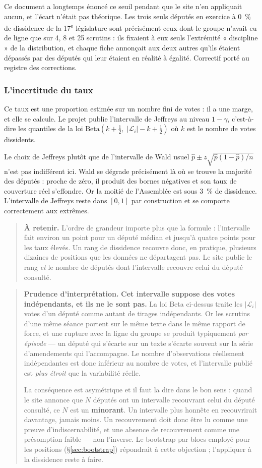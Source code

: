 \documentclass[11pt,a4paper]{article}
\newcommand{\important}[1]{\begin{quote}\small\color{blue!55!black}\textbf{À retenir.} #1\end{quote}}
\newcommand{\prudence}[1]{\begin{quote}\small\color{red!55!black}\textbf{Prudence d'interprétation.} #1\end{quote}}
\begin{document}
Ce document a longtemps énoncé ce seuil pendant que le site n'en appliquait
aucun, et l'écart n'était pas théorique. Les trois seuls députés en exercice à
0~\% de dissidence de la 17\textsuperscript{e} législature sont précisément ceux
dont le groupe n'avait eu de ligne que sur 4, 8 et 25 scrutins : ils fixaient à
eux seuls l'extrémité « discipline » de la distribution, et chaque fiche
annonçait aux deux autres qu'ils étaient dépassés par des députés qui leur
étaient en réalité à égalité. Correctif porté au registre des corrections.

\subsubsection*{L'incertitude du taux}

Ce taux est une proportion estimée sur un nombre fini de votes : il a une marge,
et elle se calcule. Le projet publie l'intervalle de Jeffreys au niveau
$1-\gamma$, c'est-à-dire les quantiles de la loi
$\mathrm{Beta}(k+\tfrac12,\;|\mathcal L_i|-k+\tfrac12)$ où $k$ est le nombre de
votes dissidents.

Le choix de Jeffreys plutôt que de l'intervalle de Wald usuel
$\hat p\pm z\sqrt{\hat p(1-\hat p)/n}$ n'est pas indifférent ici. Wald se
dégrade précisément là où se trouve la majorité des députés : proche de zéro, il
produit des bornes négatives et son taux de couverture réel s'effondre. Or la
moitié de l'Assemblée est sous 3~\% de dissidence. L'intervalle de Jeffreys
reste dans $[0,1]$ par construction et se comporte correctement aux extrêmes.

\important{L'ordre de grandeur importe plus que la formule : l'intervalle fait
environ un point pour un député médian et jusqu'à quatre points pour les taux
élevés. Un rang de dissidence recouvre donc, en pratique, plusieurs dizaines de
positions que les données ne départagent pas. Le site publie le rang \emph{et}
le nombre de députés dont l'intervalle recouvre celui du député consulté.}

\prudence{\textbf{Cet intervalle suppose des votes indépendants, et ils ne le
sont pas.} La loi Beta ci-dessus traite les $|\mathcal L_i|$ votes d'un député
comme autant de tirages indépendants. Or les scrutins d'une même séance portent
sur le même texte dans le même rapport de force, et une rupture avec la ligne du
groupe se produit typiquement \emph{par épisode} — un député qui s'écarte sur un
texte s'écarte souvent sur la série d'amendements qui l'accompagne. Le nombre
d'observations réellement indépendantes est donc inférieur au nombre de votes,
et l'intervalle publié est \emph{plus étroit} que la variabilité réelle.

La conséquence est asymétrique et il faut la dire dans le bon sens : quand le
site annonce que $N$ députés ont un intervalle recouvrant celui du député
consulté, ce $N$ est un \textbf{minorant}. Un intervalle plus honnête en
recouvrirait davantage, jamais moins. Un recouvrement doit donc être lu comme
une preuve d'indiscernabilité, et une absence de recouvrement comme une
présomption faible — non l'inverse. Le bootstrap par blocs employé pour les
positions (§\ref{sec:bootstrap}) répondrait à cette objection ; l'appliquer à la
dissidence reste à faire.}
\end{document}
